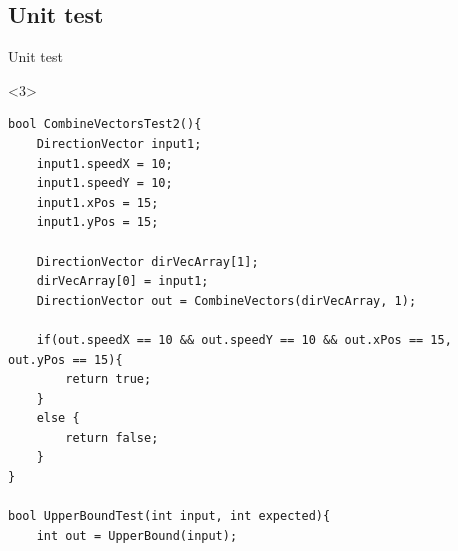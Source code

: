 \subsection{Unit test}
\begin{frame}[fragile]{Unit test}
\begin{itemize}
\end{itemize}
\begin{onlyenv}<3>
\begin{center}
\begin{minipage}[H]{0.9\linewidth}
\begin{lstlisting}
bool CombineVectorsTest2(){
	DirectionVector input1;
	input1.speedX = 10;
  	input1.speedY = 10;
  	input1.xPos = 15;
  	input1.yPos = 15;

  	DirectionVector dirVecArray[1];
  	dirVecArray[0] = input1;
  	DirectionVector out = CombineVectors(dirVecArray, 1);

  	if(out.speedX == 10 && out.speedY == 10 && out.xPos == 15, out.yPos == 15){
    	return true;
  	}
  	else {
    	return false;
  	}
}

bool UpperBoundTest(int input, int expected){
	int out = UpperBound(input);


\end{lstlisting}
\end{minipage}
\end{center}
\end{onlyenv}
\end{frame}
